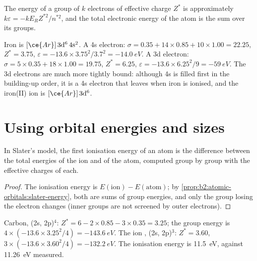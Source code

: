\begin{proposition}\label{prop:b2:atomic-orbitals:slater-energy}
The energy of a group of $k$ electrons of effective charge $Z^*$ is approximately
$k\varepsilon = -kE_RZ^{*2}/n^{*2}$, and the total electronic energy of the atom
is the sum over its groups.
\end{proposition}

\admitted

\begin{example}\label{ex:b2:atomic-orbitals:iron}
Iron is $[\ce{Ar}]\,3\mathrm d^6\,4\mathrm s^2$. A 4s electron: $\sigma = 0.35 + 14
\times 0.85 + 10 \times 1.00 = 22.25$, $Z^* = 3.75$, $\varepsilon = -13.6 \times
3.75^2/3.7^2 = \qty{-14.0}{eV}$. A 3d electron: $\sigma = 5 \times 0.35 + 18 \times 1.00 =
19.75$, $Z^* = 6.25$, $\varepsilon = -13.6 \times 6.25^2/9 = \qty{-59}{eV}$. The 3d
electrons are much more tightly bound: although 4s is filled first in the
building-up order, it is a 4s electron that leaves when iron is ionised, and the
iron(II) ion is $[\ce{Ar}]\,3\mathrm d^6$.
\end{example}

\section{Using orbital energies and sizes}

\begin{proposition}\label{prop:b2:atomic-orbitals:ionisation}
In Slater's model, the first ionisation energy of an atom is the difference
between the total energies of the ion and of the atom, computed group by group
with the effective charges of each.
\end{proposition}

\begin{proof}
The ionisation energy is $E(\text{ion}) - E(\text{atom})$; by
\cref{prop:b2:atomic-orbitals:slater-energy}, both are sums of group energies, and
only the group losing the electron changes (inner groups are not screened by
outer electrons).
\end{proof}

\begin{example}[Carbon]\label{ex:b2:atomic-orbitals:carbon}
Carbon, (2s, 2p)$^4$: $Z^* = 6 - 2 \times 0.85 - 3 \times 0.35 = 3.25$; the group energy is
$4 \times (-13.6 \times 3.25^2/4) = \qty{-143.6}{eV}$. The ion , (2s, 2p)$^3$: $Z^* =
3.60$, $3 \times (-13.6 \times 3.60^2/4) = \qty{-132.2}{eV}$. The ionisation energy is
\qty{11.5}{eV}, against \qty{11.26}{eV} measured.
\end{example}

